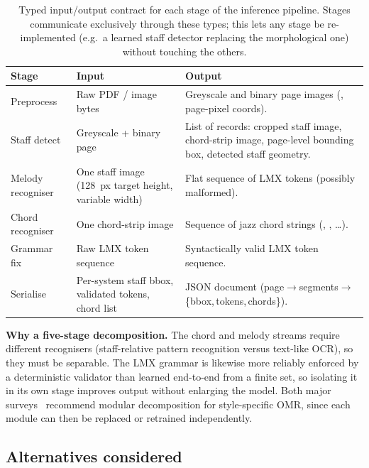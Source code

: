 

\begin{table}[ht]
\centering
\caption[Inter-stage interface contracts.]{%
Typed input/output contract for each stage of the inference pipeline.
Stages communicate exclusively through these types; this lets any
stage be re-implemented (e.g.\ a learned staff detector replacing the
morphological one) without touching the others.}
\label{tab:stage-contracts}
\small
\begin{tabularx}{\linewidth}{@{}lLL@{}}
\toprule
\textbf{Stage} & \textbf{Input} & \textbf{Output} \\
\midrule
Preprocess
  & Raw PDF / image bytes
  & Greyscale and binary page images (, page-pixel coords). \\
\tfgrowsep
Staff detect
  & Greyscale + binary page
  & List of  records: cropped staff image, chord-strip image, page-level bounding box, detected staff geometry. \\
\tfgrowsep
Melody recogniser
  & One staff image (\SI{128}{px} target height, variable width)
  & Flat sequence of LMX tokens (possibly malformed). \\
\tfgrowsep
Chord recogniser
  & One chord-strip image
  & Sequence of jazz chord strings (, , \dots). \\
\tfgrowsep
Grammar fix
  & Raw LMX token sequence
  & Syntactically valid LMX token sequence. \\
\tfgrowsep
Serialise
  & Per-system staff bbox, validated tokens, chord list
  & JSON document (page$\to$segments$\to$\{bbox,\,tokens,\,chords\}). \\
\bottomrule
\end{tabularx}
\end{table}

\textbf{Why a five-stage decomposition.}
The chord and melody streams require different recognisers
(staff-relative pattern recognition versus text-like OCR), so they
must be separable. The LMX grammar is likewise more reliably enforced
by a deterministic validator than learned end-to-end from a finite
set, so isolating it in its own stage improves output without
enlarging the model. Both major
surveys~\cite{calvoZaragozaUnderstandingOMR2020,shatriOPTICALMUSICRECOGNITION}
recommend modular decomposition for style-specific OMR, since each
module can then be replaced or retrained independently.

\subsection{Alternatives considered}
\label{sec:design-pipeline-alts}

